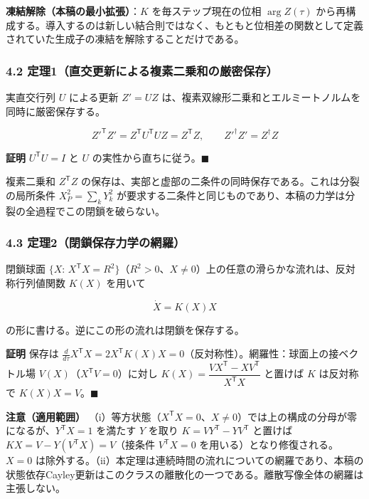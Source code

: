 \documentclass[
  a4paper,
]{ltjsarticle}
\begin{document}
\textbf{凍結解除（本稿の最小拡張）}：\(K\) を毎ステップ現在の位相
\(\arg Z(\tau)\)
から再構成する。導入するのは新しい結合則ではなく、もともと位相差の関数として定義されていた生成子の凍結を解除することだけである。

\subsubsection{4.2
定理1（直交更新による複素二乗和の厳密保存）}\label{ux5b9aux74061ux76f4ux4ea4ux66f4ux65b0ux306bux3088ux308bux8907ux7d20ux4e8cux4e57ux548cux306eux53b3ux5bc6ux4fddux5b58}

実直交行列 \(U\) による更新 \(Z'=UZ\)
は、複素双線形二乗和とエルミートノルムを同時に厳密保存する。

\[
Z'^{\mathsf T}Z'=Z^{\mathsf T}U^{\mathsf T}UZ=Z^{\mathsf T}Z,
\qquad
Z'^{\dagger}Z'=Z^{\dagger}Z
\]

\textbf{証明} \(U^{\mathsf T}U=I\) と \(U\)
の実性から直ちに従う。\(\blacksquare\)

複素二乗和 \(Z^{\mathsf T}Z\)
の保存は、実部と虚部の二条件の同時保存である。これは分裂の局所条件
\(X_P^2=\sum_kY_k^2\)
が要求する二条件と同じものであり、本稿の力学は分裂の全過程でこの閉鎖を破らない。

\subsubsection{4.3
定理2（閉鎖保存力学の網羅）}\label{ux5b9aux74062ux9589ux9396ux4fddux5b58ux529bux5b66ux306eux7db2ux7f85}

閉鎖球面
\(\{X:\,X^{\mathsf T}X=R^2\}\)（\(R^2>0\)、\(X\ne0\)）上の任意の滑らかな流れは、反対称行列値関数
\(K(X)\) を用いて

\[
\dot X=K(X)X
\]

の形に書ける。逆にこの形の流れは閉鎖を保存する。

\textbf{証明} 保存は
\(\frac{d}{d\tau}X^{\mathsf T}X=2X^{\mathsf T}K(X)X=0\)（反対称性）。網羅性：球面上の接ベクトル場
\(V(X)\)（\(X^{\mathsf T}V=0\)）に対し
\(K(X)=\dfrac{VX^{\mathsf T}-XV^{\mathsf T}}{X^{\mathsf T}X}\) と置けば
\(K\) は反対称で \(K(X)X=V\)。\(\blacksquare\)

\textbf{注意（適用範囲）}
（i）等方状態（\(X^{\mathsf T}X=0\)、\(X\ne0\)）では上の構成の分母が零になるが、\(Y^{\mathsf T}X=1\)
を満たす \(Y\) を取り \(K=VY^{\mathsf T}-YV^{\mathsf T}\) と置けば
\(KX=V-Y(V^{\mathsf T}X)=V\)（接条件 \(V^{\mathsf T}X=0\)
を用いる）となり修復される。\(X=0\)
は除外する。（ii）本定理は連続時間の流れについての網羅であり、本稿の状態依存Cayley更新はこのクラスの離散化の一つである。離散写像全体の網羅は主張しない。
\end{document}
